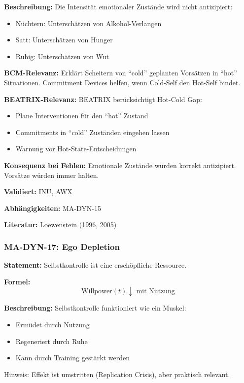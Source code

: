 \textbf{Beschreibung:}
Die Intensität emotionaler Zustände wird nicht antizipiert:
\begin{itemize}
    \item Nüchtern: Unterschätzen von Alkohol-Verlangen
    \item Satt: Unterschätzen von Hunger
    \item Ruhig: Unterschätzen von Wut
\end{itemize}

\textbf{BCM-Relevanz:}
Erklärt Scheitern von ``cold'' geplanten Vorsätzen in ``hot'' Situationen. Commitment Devices helfen, wenn Cold-Self den Hot-Self bindet.

\textbf{BEATRIX-Relevanz:}
BEATRIX berücksichtigt Hot-Cold Gap:
\begin{itemize}
    \item Plane Interventionen für den ``hot'' Zustand
    \item Commitments in ``cold'' Zuständen eingehen lassen
    \item Warnung vor Hot-State-Entscheidungen
\end{itemize}

\textbf{Konsequenz bei Fehlen:}
Emotionale Zustände würden korrekt antizipiert. Vorsätze würden immer halten.

\textbf{Validiert:} INU, AWX

\textbf{Abhängigkeiten:} MA-DYN-15

\textbf{Literatur:} Loewenstein (1996, 2005)


\subsubsection*{MA-DYN-17: Ego Depletion}

\textbf{Statement:} Selbstkontrolle ist eine erschöpfliche Ressource.

\textbf{Formel:}
\begin{equation}
\text{Willpower}(t) \downarrow \text{ mit Nutzung}
\end{equation}

\textbf{Beschreibung:}
Selbstkontrolle funktioniert wie ein Muskel:
\begin{itemize}
    \item Ermüdet durch Nutzung
    \item Regeneriert durch Ruhe
    \item Kann durch Training gestärkt werden
\end{itemize}
Hinweis: Effekt ist umstritten (Replication Crisis), aber praktisch relevant.

